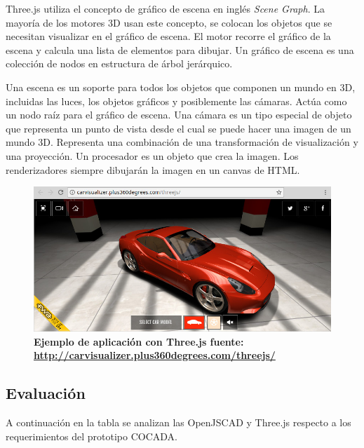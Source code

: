 Three.js utiliza el concepto de gráfico de escena en inglés \textit{Scene Graph}. La mayoría de los motores 3D usan este concepto, se colocan los objetos que se necesitan visualizar en el gráfico de escena. El motor recorre el gráfico de la escena y calcula una lista de elementos para dibujar. Un gráfico de escena es una colección de nodos en estructura de árbol jerárquico.

Una escena es un soporte para todos los objetos que componen un mundo en 3D, incluidas las luces, los objetos gráficos y posiblemente las cámaras. Actúa como un nodo raíz para el gráfico de escena. Una cámara es un tipo especial de objeto que representa un punto de vista desde el cual se puede hacer una imagen de un mundo 3D. Representa una combinación de una transformación de visualización y una proyección. Un procesador es un objeto que crea la imagen. Los renderizadores siempre dibujarán la imagen en un canvas de HTML.

\begin{figure}[h]
\includegraphics[width=15cm]{Img/WEB/web-three.jpg}
\centering
\caption{\textbf{\footnotesize{Ejemplo de aplicación con Three.js fuente: \url{http://carvisualizer.plus360degrees.com/threejs/} }}}
\label{fig:threejs}
\end{figure}

\clearpage
\subsection{Evaluación}

A continuación en la tabla se analizan las OpenJSCAD y Three.js respecto a los requerimientos del prototipo COCADA.

